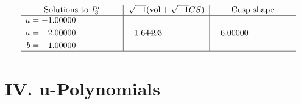 \documentclass[1p]{elsarticle_modified}
\theoremstyle{definition}
\newcommand{\I}{\sqrt{-1}}
\begin{document}
$$\begin{array}{c|c|c}  
\text{Solutions to }I^u_{3}& \I (\text{vol} + \sqrt{-1}CS) & \text{Cusp shape}\\
 \hline 
\begin{aligned}
u &= -1.00000\phantom{ +0.000000I} \\
a &= \phantom{-}2.00000\phantom{ +0.000000I} \\
b &= \phantom{-}1.00000\phantom{ +0.000000I}\end{aligned}
 & \phantom{-}1.64493\phantom{ +0.000000I} & \phantom{-}6.00000\phantom{ +0.000000I}\\
 \hline 
 \end{array}$$\newpage
\newpage\renewcommand{\arraystretch}{1}
\centering \section*{ IV. u-Polynomials}
\end{document}
